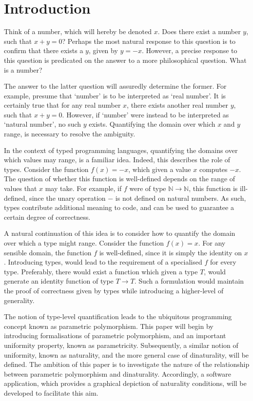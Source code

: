 \documentclass[../Dissertation.tex]{subfiles}
\begin{document}
\section{Introduction}
Think of a number, which will hereby be denoted $x$. Does there exist a number $y$, such that $x + y = 0$? Perhaps the most natural response to this question is to confirm that there exists a $y$, given by $y = -x$. However, a precise response to this question is predicated on the answer to a more philosophical question. What is a number?
\par
The answer to the latter question will assuredly determine the former. For example, presume that `number' is to be interpreted as `real number'. It is certainly true that for any real number $x$, there exists another real number $y$, such that $x + y = 0$. However, if `number' were instead to be interpreted as `natural number', no such $y$ exists. Quantifying the domain over which $x$ and $y$ range, is necessary to resolve the ambiguity.
\par
In the context of typed programming languages, quantifying the domains over which values may range, is a familiar idea. Indeed, this describes the role of types. Consider the function $f(x) = -x$, which given a value $x$ computes $-x$. The question of whether this function is well-defined depends on the range of values that $x$ may take. For example, if $f$ were of type $\mathbb{N} \rightarrow \mathbb{N}$, this function is ill-defined, since the unary operation $-$ is not defined on natural numbers. As such, types contribute additional meaning to code, and can be used to guarantee a certain degree of correctness.
\par
A natural continuation of this idea is to consider how to quantify the domain over which a type might range. Consider the function $f(x) = x$. For any sensible domain, the function $f$ is well-defined, since it is simply the identity on $x$. Introducing types, would lead to the requirement of a specialised $f$ for every type. Preferably, there would exist a function which given a type $T$, would generate an identity function of type $T \rightarrow T$. Such a formulation would maintain the proof of correctness given by types while introducing a higher-level of generality. 
\par
The notion of type-level quantification leads to the ubiquitous programming concept known as parametric polymorphism. This paper will begin by introducing formalisations of parametric polymorphism, and an important uniformity property, known as parametricity. Subsequently, a similar notion of uniformity, known as naturality, and the more general case of dinaturality, will be defined. The ambition of this paper is to investigate the nature of the relationship between parametric polymorphism and dinaturality. Accordingly, a software application, which provides a graphical depiction of naturality conditions, will be developed to facilitate this aim.
\end{document}
